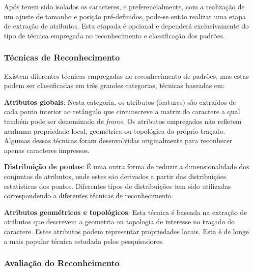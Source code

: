 		Após terem sido isolados os caracteres, e preferencialmente, com a realização de um ajuste de tamanho e posição pré-definidos, pode-se então realizar uma etapa de extração de atributos. Esta etapada é opcional e dependerá exclusivamente do tipo de técnica empregada no reconhecimento e classificação dos padrões.
		
		\subsubsection{Técnicas de Reconhecimento}
			
			Existem diferentes técnicas empregadas no reconhecimento de padrões, mas estas podem ser classificadas em três grandes categorias, técnicas baseadas em:
			
			\begin{description}
				\item \textbf{Atributos globais}: Nesta categoria, os atributos (features) são extraídos de cada ponto interior ao retângulo que circunscreve a matriz do caractere a qual também pode ser denominado de \textit{frame}. Os atributos empregados não refletem nenhuma propriedade local, geométrica ou topológica do próprio traçado. Algumas dessas técnicas foram desenvolvidas originalmente para reconhecer apenas caracteres impressos.
				\item \textbf{Distribuição de pontos}: É uma outra forma de reduzir a dimensionalidade dos conjuntos de atributos, onde estes são derivados a partir das distribuições estatísticas dos pontos. Diferentes tipos de distribuições tem sido utilizadas correspondendo a diferentes técnicas de reconhecimento.
				\item \textbf{Atributos geométricos e topológicos}: Esta técnica é baseada na extração de atributos que descrevem a geometria ou topologia de interesse no traçado do caractere. Estes atributos podem representar propriedades locais. Esta é de longe a mais popular técnica estudada pelos pesquisadores. 
			\end{description}
	
		\subsubsection{Avaliação do Reconheimento}
			
